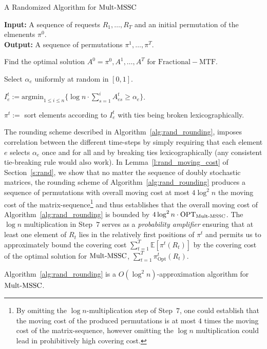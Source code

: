 \begin{algorithm}[ht]
  \caption{A Randomized Algorithm for $\mathrm{Mult}\text{-}\mathrm{MSSC}$}\label{alg:rand_rounding}
  \textbf{Input:} A sequence of requests $R_1,\ldots,R_T$ and an initial permutation of the elmenents $\pi^0$.\\
  \textbf{Output:} A sequence of permutations $\pi^1,\ldots,\pi^T$.

 \begin{algorithmic}[1]
 \STATE Find the optimal solution $A^0=\pi^0,A^1,\ldots,A^T$ for $\mathrm{Fractional-MTF}$. 

        \STATE Select $\alpha_e$ uniformly at random in $[0,1]$.
        \ENDFOR

              
                \STATE $I_e^t := \mathrm{argmin}_{1\leq i \leq n} \{ \log n \cdot \sum_{s=1}^i 
                A_{es}^t \geq \alpha_e\}$.
        \ENDFOR
            
            \STATE $\pi^t:=$ sort elements according to $I_e^t$ with ties being broken lexicographically.
\ENDFOR
  \end{algorithmic}
\end{algorithm}
The rounding scheme described in Algorithm~\ref{alg:rand_rounding}, imposes correlation between the different time-steps by simply requiring that each element $e$ selects $\alpha_e$ once and for all and by breaking ties lexicographically (any consistent tie-breaking rule would also work). In Lemma~\ref{l:rand_moving_cost} of Section~\ref{s:rand}, we show that no matter the sequence of doubly stochastic matrices, the rounding scheme of Algorithm~\ref{alg:rand_rounding} produces a sequence of permutations with overall moving cost at most $4\log^2 n$ the moving cost of the matrix-sequence\footnote{By omitting 
the $\log n$-multiplication step of Step~$7$, one could establish that the moving cost of the produced permutations is at most $4$ times the moving cost of the matrix-sequence, however omitting the $\log n$ multiplication could lead in prohibitively high covering cost.} and thus establishes that the overall moving cost of Algorithm~\ref{alg:rand_rounding} is bounded by $4\log^2 n \cdot \mathrm{OPT}_{\mathrm{Mult}\text{-}\mathrm{MSSC}}$. The $\log n$ multiplication in Step~$7$ serves as a \textit{probability amplifier} ensuring that at least one element of $R_t$ lies in the relatively first positions of $\pi^t$ and permits us to approximately bound the covering cost $\sum_{t=1}^T \mathbb{E}\left[\pi^t(R_t) \right]$ by the covering cost of the optimal solution for $\mathrm{Mult}\text{-}\mathrm{MSSC}$,
$\sum_{t=1}^T \pi_\mathrm{Opt}^t(R_t)$.
\begin{theorem}\label{t:rand}
Algorithm~\ref{alg:rand_rounding} is a $O(\log^2 n)$-approximation algorithm for $\mathrm{Mult}\text{-}\mathrm{MSSC}$.
\end{theorem}

